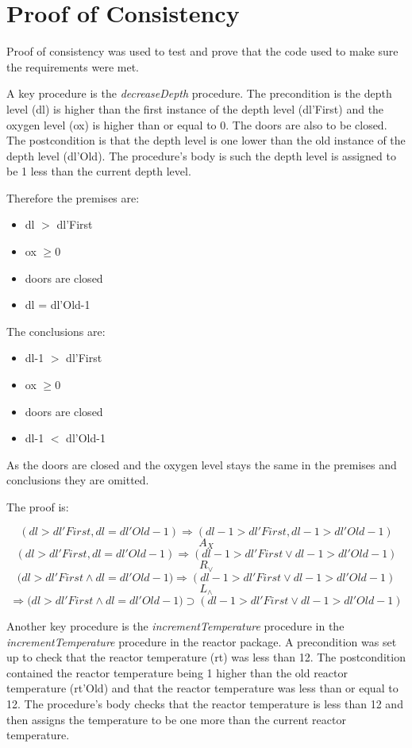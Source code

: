 \section{Proof of Consistency}
Proof of consistency was used to test and prove that the code used to make sure the requirements were met.

A key procedure is the \textit{decreaseDepth} procedure. The precondition is the depth level (dl) is higher than the first instance of the depth level (dl'First) and the oxygen level (ox) is higher than or equal to 0. The doors are also to be closed. The postcondition is that the depth level is one lower than the old instance of the depth level (dl'Old). The procedure's body is such the depth level is assigned to be 1 less than the current depth level.

Therefore the premises are:
\begin{itemize}
	\item dl $>$ dl'First
	\item ox $\geq{0}$
	\item doors are closed
	\item dl = dl'Old-1
\end{itemize}

The conclusions are:

\begin{itemize}
	\item dl-1 $>$ dl'First
	\item  ox $\geq{ 0}$
	\item doors are closed
	\item dl-1 $<$ dl'Old-1
\end{itemize}

As the doors are closed and the oxygen level stays the same in the premises and conclusions they are omitted.

The proof is:


\[
	(dl>dl'First, dl= dl'Old-1) \Rightarrow{} (dl-1>dl'First, dl-1>dl'Old-1)
\]
\[
A_X
\]
\[
	(dl>dl'First, dl= dl'Old-1) \Rightarrow{} (dl-1>dl'First \lor{ dl-1>dl'Old-1})
\]
\[
	R_\lor{}
\]
\[
	(dl>dl'First \land{dl= dl'Old-1)} \Rightarrow{} (dl-1>dl'First \lor{ dl-1>dl'Old-1})
\]
\[
	L_\land{}
\]
\[
	\Rightarrow{} (dl>dl'First \land{dl= dl'Old-1)} \supset (dl-1>dl'First \lor{ dl-1>dl'Old-1})
\]
\newpage

Another key procedure is the \textit{incrementTemperature} procedure in the \textit{incrementTemperature} procedure in the reactor package. A precondition was set up to check that the reactor temperature (rt) was less than 12. The postcondition contained the reactor temperature being 1 higher than the old reactor temperature (rt'Old) and that the reactor temperature was less than or equal to 12. The procedure's body checks that the reactor temperature is less than 12 and then assigns the temperature to be one more than the current reactor temperature. 

